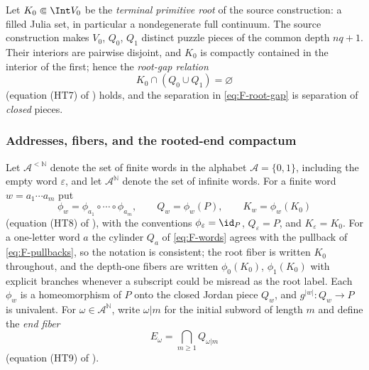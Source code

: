 Let $K_0\Subset\Int V_0$ be the \emph{terminal primitive root} of the
source construction: a filled Julia set, in particular a nondegenerate
full continuum.  The source construction makes $V_0$, $Q_0$, $Q_1$
distinct puzzle pieces of the common depth $nq+1$.  Their interiors are
pairwise disjoint, and $K_0$ is compactly contained in the interior of the
first; hence the \emph{root-gap relation}
\begin{equation}\label{eq:F-root-gap}
K_0\cap(Q_0\cup Q_1)=\varnothing
\end{equation}
(equation (HT7) of \cite{MWman}) holds, and the separation in
\eqref{eq:F-root-gap} is separation of \emph{closed} pieces.

\subsubsection*{Addresses, fibers, and the rooted-end compactum}
Let $\mathcal A^{<\mathbb N}$ denote the set of finite words in the
alphabet $\mathcal A=\{0,1\}$, including the empty word $\varepsilon$, and
let $\mathcal A^{\mathbb N}$ denote the set of infinite words.  For a
finite word $w=a_1\cdots a_m$ put
\begin{equation}\label{eq:F-words}
\phi_w=\phi_{a_1}\circ\cdots\circ\phi_{a_m},
\qquad
Q_w=\phi_w(P),
\qquad
K_w=\phi_w(K_0)
\end{equation}
(equation (HT8) of \cite{MWman}), with the conventions
$\phi_\varepsilon=\id_P$, $Q_\varepsilon=P$, and
$K_\varepsilon=K_0$.  For a one-letter word $a$ the cylinder $Q_a$ of
\eqref{eq:F-words} agrees with the pullback of \eqref{eq:F-pullbacks}, so
the notation is consistent; the root fiber is written $K_0$ throughout,
and the depth-one fibers are written $\phi_0(K_0)$, $\phi_1(K_0)$ with
explicit branches whenever a subscript could be misread as the root
label.  Each $\phi_w$ is a homeomorphism of $P$ onto the closed Jordan
piece $Q_w$, and $g^{|w|}\colon Q_w\to P$ is univalent.  For
$\omega\in\mathcal A^{\mathbb N}$, write $\omega|m$ for the initial
subword of length $m$ and define the \emph{end fiber}
\begin{equation}\label{eq:F-end-fiber}
E_\omega=\bigcap_{m\ge1}Q_{\omega|m}
\end{equation}
(equation (HT9) of \cite{MWman}).

